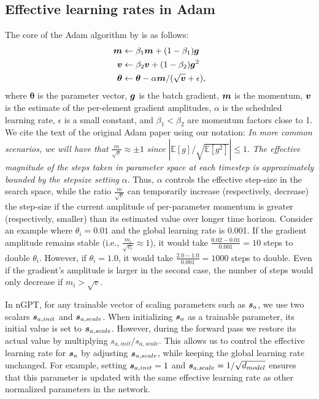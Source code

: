 \documentclass{article} %
\begin{document}
\subsection{Effective learning rates in Adam}
The core of the Adam algorithm by \citet{kingma2014adam} is as follows: 
\begin{align}
    {\bm{m}} &\leftarrow \beta_1 {\bm{m}} + (1 - \beta_1) {\bm{g}}  \notag \\ 
    {\bm{v}} &\leftarrow \beta_2 {\bm{v}} + (1 - \beta_2) {\bm{g}}^2  \notag \\ 
    \bm{\theta} &\leftarrow \bm{\theta} - \alpha {\bm{m}} / (\sqrt{{\bm{v}}} + \epsilon) , \label{eq:qkscaling}
\end{align}
where $\bm{\theta}$ is the parameter vector, ${\bm{g}}$ is the batch gradient, ${\bm{m}}$ is the momentum, ${\bm{v}}$ is the estimate of the per-element gradient amplitudes, $\alpha$ is the scheduled learning rate, $\epsilon$ is a small constant, and $\beta_1<\beta_2$ are momentum factors close to 1. We cite the text of the original Adam paper using our notation: \textit{In more common scenarios, we will have that} $ \frac{m}{\sqrt{v}} \approx \pm 1 $ \textit{since} $\left| {\mathbb{E}[g]}/{\sqrt{\mathbb{E}[g^2]}} \right| \leq 1 $. \textit{The effective magnitude of the steps taken in parameter space at each timestep is approximately bounded by the stepsize setting} $\alpha$. Thus, $\alpha$ controls the effective step-size in the search space, while the ratio $\frac{m}{\sqrt{v}}$ can temporarily increase (respectively, decrease) the step-size if the current amplitude of per-parameter momentum is greater (respectively, smaller) than its estimated value over longer time horizon. 
Consider an example where  $\theta_i = 0.01$ and the global learning rate is 0.001. If the gradient amplitude remains stable (i.e., $ \frac{m_i}{\sqrt{v_i}} \approx 1 $), it would take $\frac{0.02-0.01}{0.001}=10$ steps to double $\theta_i$. However, if $\theta_i=1.0$, it would take $\frac{2.0-1.0}{0.001}=1000$  steps to double. Even if the gradient's amplitude is larger in the second case, the number of steps would only decrease if ${m_i}>\sqrt{v}$. 


In nGPT, for any trainable vector of scaling parameters such as ${\bm{s}}_a$, we use two scalars ${\bm{s}}_{a,init}$ and ${\bm{s}}_{a,scale}$. When initializing ${\bm{s}}_a$ as a trainable parameter, its initial value is set to ${\bm{s}}_{a,scale}$. However, during the forward pass we restore its actual value by multiplying $ s_{a,init}/s_{a,scale}$. This allows us to control the effective learning rate for ${\bm{s}}_{a}$ by adjusting ${\bm{s}}_{a,scale}$, while keeping the global learning rate unchanged. For example, setting ${\bm{s}}_{a,init}=1$ and ${\bm{s}}_{a,scale}=1/\sqrt{d_{model}}$ ensures that this parameter is updated with the same effective learning rate as other normalized parameters in the network.
\end{document}
